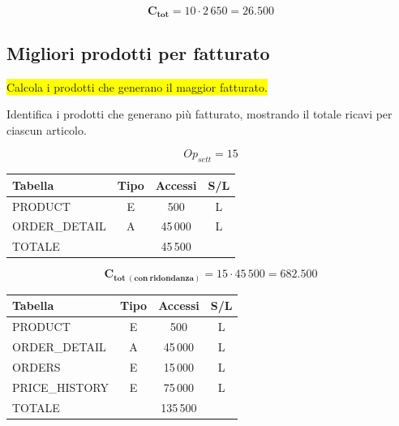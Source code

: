 \documentclass[a4paper,12pt]{report}
\begin{document}
$$\mathbf{C_{tot}} = 10 \cdot 2\,650 = \mathbf{26.500}$$

\subsection*{Migliori prodotti per fatturato} \label{op4}

\colorbox{yellow}{Calcola i prodotti che generano il maggior fatturato.}

Identifica i prodotti che generano più fatturato, mostrando il totale
ricavi per ciascun articolo.



$$Op_{sett} = 15$$

\begin{table}[H]
  \centering
  \small
  \renewcommand{\arraystretch}{1.15}
  \begin{tabularx}{0.9\textwidth}{|X|c|c|c|}
    \hline
    \rowcolor{gray!20}
    \textbf{Tabella} & \textbf{Tipo} & \textbf{Accessi} & \textbf{S/L} \\
    \hline
    PRODUCT & E & 500 & L \\
    ORDER\_DETAIL & A & 45\,000 & L \\
    \hline
    \rowcolor{gray!20}
    TOTALE & & 45\,500 & \\
    \hline
  \end{tabularx}
  \vspace{-1em}
\end{table}

$$\mathbf{C_{tot\ (con\ ridondanza)}} = 15 \cdot 45\,500 = \mathbf{682.500}$$

\begin{table}[H]
  \centering
  \small
  \renewcommand{\arraystretch}{1.15}
  \begin{tabularx}{0.9\textwidth}{|X|c|c|c|}
    \hline
    \rowcolor{gray!20}
    \textbf{Tabella} & \textbf{Tipo} & \textbf{Accessi} & \textbf{S/L} \\
    \hline
    PRODUCT & E & 500 & L \\
    ORDER\_DETAIL & A & 45\,000 & L \\
    ORDERS & E & 15\,000 & L \\
    PRICE\_HISTORY & E & 75\,000 & L \\
    \hline
    \rowcolor{gray!20}
    TOTALE & & 135\,500 & \\
    \hline
  \end{tabularx}
  \vspace{-1em}
\end{table}
\end{document}
